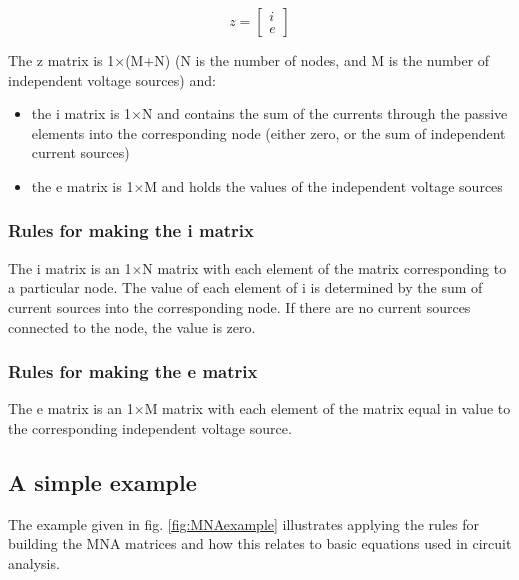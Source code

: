 \documentclass[10pt]{report}
\begin{document}
\begin{equation}
z =
\begin{bmatrix}
i\\
e
\end{bmatrix}
\end{equation}

The z matrix is 1$\times$(M+N) (N is the number of nodes, and M is the
number of independent voltage sources) and:

\begin{itemize}
\item
the i matrix is 1$\times$N and contains the sum of the currents through the
passive elements into the corresponding node (either zero, or the sum
of independent current sources)
\item
the e matrix is 1$\times$M and holds the values of the independent
voltage sources
\end{itemize}

\subsubsection{Rules for making the i matrix}

The i matrix is an 1$\times$N matrix with each element of the matrix
corresponding to a particular node.  The value of each element of i is
determined by the sum of current sources into the corresponding node.
If there are no current sources connected to the node, the value is
zero.

\subsubsection{Rules for making the e matrix}

The e matrix is an 1$\times$M matrix with each element of the matrix
equal in value to the corresponding independent voltage source.

\subsection{A simple example}

The example given in fig. \ref{fig:MNAexample} illustrates applying
the rules for building the MNA matrices and how this relates to basic
equations used in circuit analysis.
\end{document}
